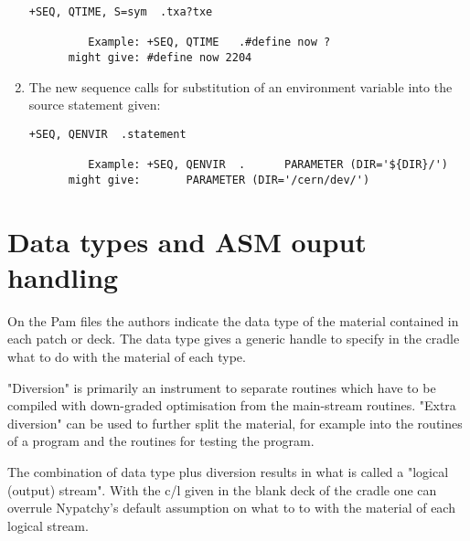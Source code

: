 \begin{enumerate}
\begin{verbatim}
+SEQ, QTIME, S=sym  .txa?txe

         Example: +SEQ, QTIME   .#define now ?
      might give: #define now 2204
\end{verbatim}

\item
The new sequence  calls for substitution of an environment
variable into the source statement given:
\begin{verbatim}
+SEQ, QENVIR  .statement

         Example: +SEQ, QENVIR  .      PARAMETER (DIR='${DIR}/')
      might give:       PARAMETER (DIR='/cern/dev/')
\end{verbatim}
\end{enumerate}


\section{Data types and ASM ouput handling}

\renewcommand{\labelenumi}{7.\theenumi)\ }

On the Pam files the authors indicate the data type of the material contained
in each patch or deck. The data type gives a generic handle to specify in the
cradle what to do with the material of each type.

"Diversion" is primarily an instrument to separate routines which have to
be compiled with down-graded optimisation from the main-stream routines.
"Extra diversion" can be used to further split the material, for example
into the routines of a program and the routines for testing the program.

The combination of data type plus diversion results in what is called a
"logical (output) stream". With the c/l  given in the blank
deck of the cradle one can overrule Nypatchy's default assumption on
what to to with the material of each logical stream.


